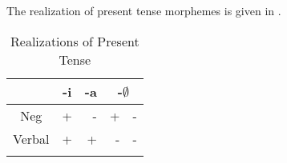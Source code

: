 \documentclass[output=paper]{langsci/langscibook}
\begin{document}
The realization of present tense morphemes is given in .

\begin{table}
\caption{Realizations of Present Tense} %
\centering %
\begin{tabular}{c| r|r|rr} %
\lsptoprule%
 &\multicolumn{1}{c}{-i}& \multicolumn{1}{|c|}{-a}& \multicolumn{2}{|c}{-$\emptyset$} \\ [0.5ex] 
\midrule%
Neg & + & - & + & -\\ %
Verbal & + & + & -& -\\[1ex] %
\lspbottomrule%
\end{tabular} 
\label{tab:hresult} 
\end{table} 
\end{document}
